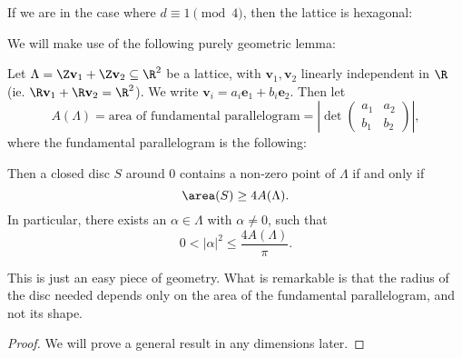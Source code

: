 \documentclass[a4paper]{article}
\begin{document}
If we are in the case where $d \equiv 1 \pmod 4$, then the lattice is hexagonal:
\begin{center}
\end{center}
We will make use of the following purely geometric lemma:
\begin{lemma}
  Let $\Lambda = \Z \mathbf{v}_1 + \Z \mathbf{v}_2 \subseteq \R^2$ be a lattice, with $\mathbf{v}_1, \mathbf{v}_2$ linearly independent in $\R$ (ie. $\R \mathbf{v}_1 + \R \mathbf{v}_2 = \R^2$). We write $\mathbf{v}_i = a_i \mathbf{e}_1 + b_i \mathbf{e}_2$. Then let
  \[
    A(\Lambda) = \text{area of fundamental parallelogram} = \left|\det
    \begin{pmatrix}
      a_1 & a_2\\
      b_1 & b_2
    \end{pmatrix}\right|,
  \]
  where the fundamental parallelogram is the following:
  \begin{center}
  \end{center}
  Then a closed disc $S$ around $0$ contains a non-zero point of $\Lambda$ if and only if
  \[
    \area(S) \geq 4 A(\Lambda).
  \]
  In particular, there exists an $\alpha \in \Lambda$ with $\alpha \not= 0$, such that
  \[
    0 < |\alpha|^2 \leq \frac{4 A(\Lambda)}{\pi}.
  \]
\end{lemma}
This is just an easy piece of geometry. What is remarkable is that the radius of the disc needed depends only on the area of the fundamental parallelogram, and not its shape.

\begin{proof}
  We will prove a general result in any dimensions later.
\end{proof}
\end{document}
